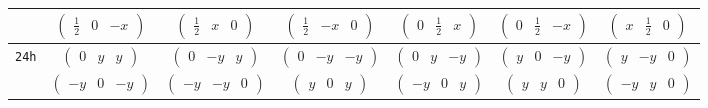 \documentclass[fleqn,9pt,landscape]{jsarticle}
\begin{document}
\begin{center}
\begin{longtable}{ccccccc}
& $ \begin{pmatrix} \frac{1}{2} & 0 & - x \end{pmatrix} $ & $ \begin{pmatrix} \frac{1}{2} & x & 0 \end{pmatrix} $ & $ \begin{pmatrix} \frac{1}{2} & - x & 0 \end{pmatrix} $ & $ \begin{pmatrix} 0 & \frac{1}{2} & x \end{pmatrix} $ & $ \begin{pmatrix} 0 & \frac{1}{2} & - x \end{pmatrix} $ & $ \begin{pmatrix} x & \frac{1}{2} & 0 \end{pmatrix} $ \\ \hline
{\tt 24h} & $ \begin{pmatrix} 0 & y & y \end{pmatrix} $ & $ \begin{pmatrix} 0 & - y & y \end{pmatrix} $ & $ \begin{pmatrix} 0 & - y & - y \end{pmatrix} $ & $ \begin{pmatrix} 0 & y & - y \end{pmatrix} $ & $ \begin{pmatrix} y & 0 & - y \end{pmatrix} $ & $ \begin{pmatrix} y & - y & 0 \end{pmatrix} $ \\
& $ \begin{pmatrix} - y & 0 & - y \end{pmatrix} $ & $ \begin{pmatrix} - y & - y & 0 \end{pmatrix} $ & $ \begin{pmatrix} y & 0 & y \end{pmatrix} $ & $ \begin{pmatrix} - y & 0 & y \end{pmatrix} $ & $ \begin{pmatrix} y & y & 0 \end{pmatrix} $ & $ \begin{pmatrix} - y & y & 0 \end{pmatrix} $ \\ \hline

\end{longtable}
\end{center}
\end{document}
